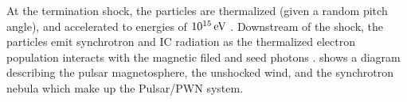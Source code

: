 At the termination shock, the particles are thermalized
(given a random pitch angle), and accelerated to energies of
$10^{15}\,\text{eV}$ \citep{arons_1996_pulsars-gamma-rays}.
Downstream of the shock, the particles emit synchrotron and \ac{IC}
radiation as the thermalized electron population interacts with the
magnetic filed and seed photons \citep{gaensler_2006_evolution-structure}.
 shows a diagram describing the pulsar
magnetosphere, the unshocked wind, and the synchrotron nebula which make
up the Pulsar/\ac{PWN} system.
